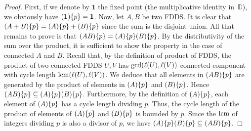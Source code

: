 	\begin{proof}
		First, if we denote by $\mathbf{1}$ the fixed point (the multiplicative identity in~$\mathbb{D}$), we obviously have $(\mathbf{1})\{p\} = \mathbf{1}$. 
		Now, let $A,B$ be two FDDS. 
		It is clear that $(A + B)\{p\} = (A)\{p\} + (B)\{p\}$ since the sum is the disjoint union.
		All that remains to prove is that $(AB)\{p\} = (A)\{p\} (B)\{p\}$.
		By the distributivity of the sum over the product, it is sufficient to show the property in the case of connected $A$ and $B$. 
		Recall that, by the definition of product of FDDS, the product of two connected FDDS $U,V$ has $\gcd(\ell(U),\ell(V))$ connected component with cycle length $\operatorname{lcm}(\ell(U), \ell(V))$.  
		We deduce that all elements in $(AB)\{p\}$ are generated by the product of elements in $(A)\{p\}$ and $(B)\{p\}$.
		Hence $(AB)\{p\} \subseteq (A)\{p\}(B)\{p\}$.
		Furthermore, by the definition of $(A)\{p\}$, each element of $(A)\{p\}$ has a cycle length dividing $p$.
		Thus, the cycle length of the product of elements of $(A)\{p\}$ and $(B)\{p\}$ is bounded by $p$.
		Since the $\operatorname{lcm}$ of integers dividing $p$ is also a divisor of $p$, we have $(A)\{p\} (B)\{p\} \subseteq (AB)\{p\}$.
	\end{proof}
	
	
	
	
